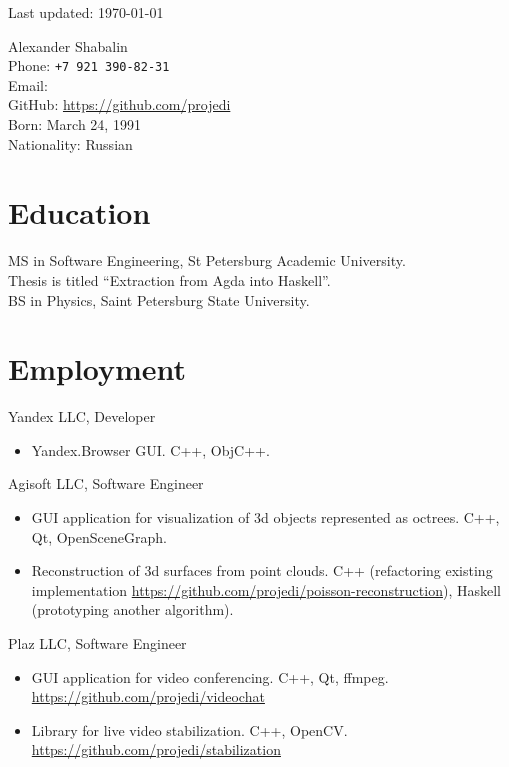 \thispagestyle{empty}

\begin{flushright}
\scriptsize Last updated: \today
\end{flushright}

{\LARGE Alexander Shabalin}\\[1cm]
Phone: \texttt{+7 921 390-82-31}\\
Email: \\
GitHub: \url{https://github.com/projedi}\\[.1cm]
Born: March 24, 1991\\
Nationality: Russian

\section*{Education}

   MS in Software Engineering, St Petersburg Academic University.\\
   Thesis is titled ``Extraction from Agda into Haskell''.\\[.3cm]
   BS in Physics, Saint Petersburg State University.

\section*{Employment}

  Yandex LLC, Developer
  \begin{itemize}
    \itemsep 0cm
    \item Yandex.Browser GUI.
          C++, ObjC++.
  \end{itemize}

   Agisoft LLC, Software Engineer
   \begin{itemize}
      \itemsep 0cm
      \item GUI application for visualization of 3d objects represented as octrees.
            C++, Qt, OpenSceneGraph.
      \item Reconstruction of 3d surfaces from point clouds.
            C++ (refactoring existing implementation
            \url{https://github.com/projedi/poisson-reconstruction}),
            Haskell (prototyping another algorithm).
   \end{itemize}
   Plaz LLC, Software Engineer
   \begin{itemize}
      \itemsep 0cm
      \item GUI application for video conferencing. C++, Qt, ffmpeg.\\
            \url{https://github.com/projedi/videochat}
      \item Library for live video stabilization. C++, OpenCV.\\
            \url{https://github.com/projedi/stabilization}
   \end{itemize}

